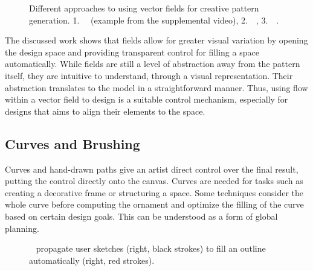 \begin{figure}
    \centering
    \caption{\label{fig:fields}Different approaches to using vector fields for creative pattern generation. 1.~\citeauthor*{gieseke_2017_ooo}~\cite{gieseke_2017_ooo} (example from the supplemental video), 2.~\citeauthor*{hsu_2020_aef}~\cite{hsu_2020_aef}, 3.~\citeauthor*{saputra_2017_ffo}~\cite{saputra_2017_ffo}.}
\end{figure}

The discussed work shows that fields allow for greater visual variation by opening the design space and  providing transparent control for filling a space automatically. While fields are still a level of abstraction away from the pattern itself, they are intuitive to understand, \eg through a visual representation. Their abstraction translates to the model in a straightforward manner. Thus, using flow within a vector field to design is a suitable control mechanism, especially for designs that aims to align their elements to the space.


\subsection{Curves and Brushing}
\label{subsubsec:analysis_creative_means_curves}

Curves and hand-drawn paths give an artist direct control over the final result, putting the control directly onto the canvas. Curves are needed for tasks such as creating a decorative frame or structuring a space. Some techniques consider the whole curve before computing the ornament and optimize the filling of the curve based on certain design goals. This can be understood as a form of global planning. 

\begin{figure}
    \centering
    \caption{\label{fig:xing_2014_apr}\citeauthor*{xing_2014_apr}~\cite{xing_2014_apr} propagate user sketches (right, black strokes) to fill an outline automatically (right, red strokes).}
\end{figure}

